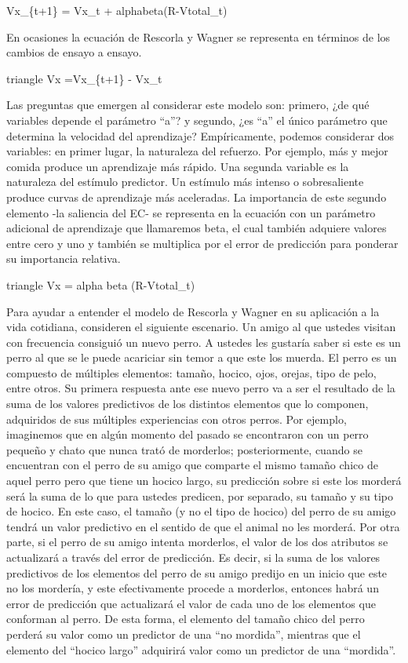 \documentclass[
  letterpaper,
]{book}
\begin{document}
Vx\_\{t+1\} = Vx\_t + alphabeta(R-Vtotal\_t)

En ocasiones la ecuación de Rescorla y Wagner se representa en términos
de los cambios de ensayo a ensayo.

triangle Vx =Vx\_\{t+1\} - Vx\_t

Las preguntas que emergen al considerar este modelo son: primero, ¿de
qué variables depende el parámetro ``a''? y segundo, ¿es ``a'' el único
parámetro que determina la velocidad del aprendizaje? Empíricamente,
podemos considerar dos variables: en primer lugar, la naturaleza del
refuerzo. Por ejemplo, más y mejor comida produce un aprendizaje más
rápido. Una segunda variable es la naturaleza del estímulo predictor. Un
estímulo más intenso o sobresaliente produce curvas de aprendizaje más
aceleradas. La importancia de este segundo elemento -la saliencia del
EC- se representa en la ecuación con un parámetro adicional de
aprendizaje que llamaremos beta, el cual también adquiere valores entre
cero y uno y también se multiplica por el error de predicción para
ponderar su importancia relativa.

triangle Vx = alpha beta (R-Vtotal\_t)

Para ayudar a entender el modelo de Rescorla y Wagner en su aplicación a
la vida cotidiana, consideren el siguiente escenario. Un amigo al que
ustedes visitan con frecuencia consiguió un nuevo perro. A ustedes les
gustaría saber si este es un perro al que se le puede acariciar sin
temor a que este los muerda. El perro es un compuesto de múltiples
elementos: tamaño, hocico, ojos, orejas, tipo de pelo, entre otros. Su
primera respuesta ante ese nuevo perro va a ser el resultado de la suma
de los valores predictivos de los distintos elementos que lo componen,
adquiridos de sus múltiples experiencias con otros perros. Por ejemplo,
imaginemos que en algún momento del pasado se encontraron con un perro
pequeño y chato que nunca trató de morderlos; posteriormente, cuando se
encuentran con el perro de su amigo que comparte el mismo tamaño chico
de aquel perro pero que tiene un hocico largo, su predicción sobre si
este los morderá será la suma de lo que para ustedes predicen, por
separado, su tamaño y su tipo de hocico. En este caso, el tamaño (y no
el tipo de hocico) del perro de su amigo tendrá un valor predictivo en
el sentido de que el animal no les morderá. Por otra parte, si el perro
de su amigo intenta morderlos, el valor de los dos atributos se
actualizará a través del error de predicción. Es decir, si la suma de
los valores predictivos de los elementos del perro de su amigo predijo
en un inicio que este no los mordería, y este efectivamente procede a
morderlos, entonces habrá un error de predicción que actualizará el
valor de cada uno de los elementos que conforman al perro. De esta
forma, el elemento del tamaño chico del perro perderá su valor como un
predictor de una ``no mordida'', mientras que el elemento del ``hocico
largo'' adquirirá valor como un predictor de una ``mordida''.
\end{document}
